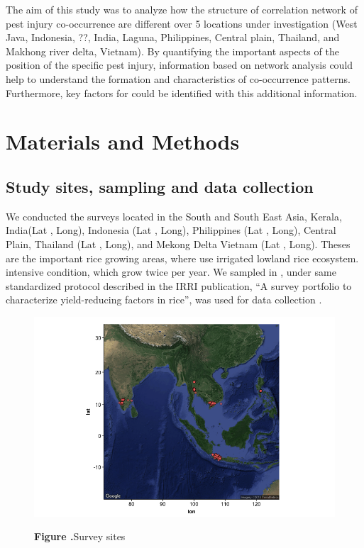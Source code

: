 \documentclass[a4paper]{article}
\begin{document}
The aim of this study was to analyze how the structure of correlation network of pest injury co-occurrence are different over 5 locations under investigation (West Java, Indonesia, ??, India, Laguna, Philippines, Central plain, Thailand, and Makhong river delta, Vietnam). By quantifying the important aspects of the position of the specific pest injury, information based on network analysis could help to understand the formation and characteristics of co-occurrence patterns. Furthermore, key factors for could be identified with this additional information.

\section*{Materials and Methods}

\subsection*{Study sites, sampling and data collection}
We conducted the surveys located in the South and South East Asia, Kerala, India(Lat , Long), Indonesia (Lat , Long), Philippines (Lat , Long), Central Plain, Thailand (Lat , Long), and Mekong Delta Vietnam (Lat , Long). Theses are the important rice growing areas, where use irrigated lowland rice ecosystem.  intensive condition, which grow twice per year. We sampled in , under same standardized protocol described in the IRRI publication, ``A survey portfolio to characterize yield-reducing factors in rice'', was used for data collection \citep{Savarysurvey2009}.

\begin{figure}[h!]
\begin{center}
\includegraphics[width=15cm]{surveylocation}
\end{center}
 \textbf{\label{Netcountry} Figure .}{Survey sites}
\end{figure}
\end{document}
